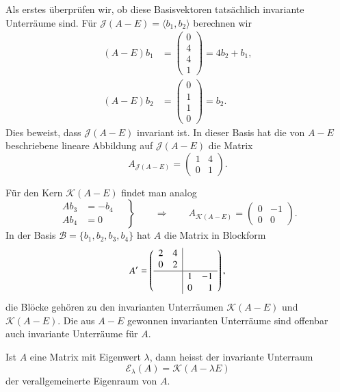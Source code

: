 \begin{beispiel}
Als erstes überprüfen wir, ob diese Basisvektoren tatsächlich invariante
Unterräume sind.
Für $\mathcal{J}(A-E) = \langle b_1,b_2\rangle$
berechnen wir
\begin{align*}
(A-E)b_1
&=
\begin{pmatrix} 0\\4\\4\\1 \end{pmatrix}
=
4b_2+b_1,
\\
(A-E)b_2
&=
\begin{pmatrix} 0\\1\\1\\0 \end{pmatrix}
=
b_2.
\end{align*}
Dies beweist, dass $\mathcal{J}(A-E)$ invariant ist.
In dieser Basis hat die von $A-E$ beschriebene lineare Abbildung
auf $\mathcal{J}(A-E)$ die Matrix
\[
A_{\mathcal{J}(A-E)}
=
\begin{pmatrix}
1&4\\
0&1
\end{pmatrix}.
\]

Für den Kern $\mathcal{K}(A-E)$ findet man analog
\[
\left.
\begin{aligned}
Ab_3
&=
-b_4
\\
Ab_4
&=0
\end{aligned}
\quad\right\}
\qquad\Rightarrow\qquad
A_{\mathcal{K}(A-E)}
=
\begin{pmatrix}
0&-1\\
0& 0
\end{pmatrix}.
\]
In der Basis $\mathcal{B}=\{b_1,b_2,b_3,b_4\}$ hat $A$ die Matrix
in Blockform
\[
A'
=
\left(
\begin{array}{cc|cr}
2&4& & \\
0&2& & \\
\hline
 & &1&-1\\
 & &0& 1
\end{array}\right),
\]
die Blöcke gehören zu den invarianten Unterräumen $\mathcal{K}(A-E)$
und $\mathcal{K}(A-E)$.
Die aus $A-E$ gewonnen invarianten Unterräume sind offenbar auch invariante
Unterräume für $A$.
\end{beispiel}

\begin{definition}
Ist $A$ eine Matrix mit Eigenwert $\lambda$, dann heisst der invariante
Unterraum
\[
\mathcal{E}_{\lambda}(A)
=
\mathcal{K}(A-\lambda E)
\]
der verallgemeinerte Eigenraum von $A$.
\end{definition}

